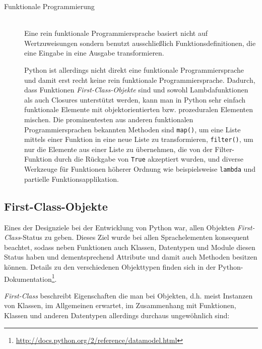\begin{description}
\item[Funktionale Programmierung] \hfill \\
Eine rein funktionale Programmiersprache basiert nicht auf Wertzuweisungen sondern benutzt
ausschließlich Funktionsdefinitionen, die eine Eingabe in eine Ausgabe transformieren.
\citep[Kap. 1.3.1]{progsprachen}

Python ist allerdings nicht direkt eine funktionale Programmiersprache und damit erst recht keine
rein funktionale Programmiersprache. Dadurch, dass Funktionen \emph{First-Class-Objekte} sind und
sowohl Lambdafunktionen als auch Closures unterstützt werden, kann man in Python sehr einfach
funktionale Elemente mit objektorientierten bzw. prozeduralen Elementen mischen. Die prominentesten
aus anderen funktionalen Programmiersprachen bekannten Methoden sind \lstinline{map()}, um eine
Liste mittels einer Funktion in eine neue Liste zu transformieren, \lstinline{filter()}, um nur die
Elemente aus einer Liste zu übernehmen, die von der Filter-Funktion durch die Rückgabe von
\lstinline{True} akzeptiert wurden, und diverse Werkzeuge für Funktionen höherer Ordnung wie
beispielsweise \lstinline{lambda} und partielle Funktionsapplikation.
\end{description}



\subsection{First-Class-Objekte}\label{firstclass}

Eines der Designziele bei der Entwicklung von Python war, allen Objekten \emph{First-Class}-Status
\citep{pyhist:firstclass} zu geben. Dieses Ziel wurde bei allen Sprachelementen konsequent beachtet,
sodass neben Funktionen auch Klassen, Datentypen und Module diesen Status haben und dementsprechend
Attribute und damit auch Methoden besitzen können. Details zu den verschiedenen Objekttypen finden
sich in der Python-Dokumentation\footnote{\href{http://docs.python.org/2/reference/datamodel.html}{http://docs.python.org/2/reference/datamodel.html}}.

\emph{First-Class} beschreibt Eigenschaften die man bei Objekten, d.h. meist Instanzen von Klassen,
im Allgemeinen erwartet, im Zusammenhang mit Funktionen, Klassen und anderen Datentypen allerdings
durchaus ungewöhnlich sind:

